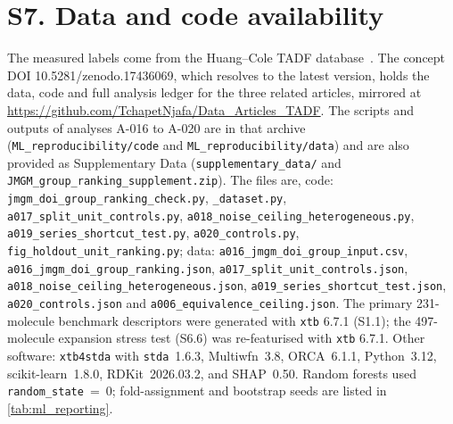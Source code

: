 \documentclass[final,3p,times,twocolumn]{elsarticle}
\begin{document}
\section*{S7. Data and code availability}
The measured labels come from the Huang--Cole TADF database~\cite{HuangCole2024}.
The concept DOI \mbox{10.5281/zenodo.17436069}, which resolves to the latest version,
holds the data, code and full analysis ledger for the three related articles, mirrored at
\url{https://github.com/TchapetNjafa/Data_Articles_TADF}.
The scripts and outputs of analyses A-016 to A-020 are in that archive
(\texttt{ML\_reproducibility/code} and \texttt{ML\_reproducibility/data}) and are also
provided as Supplementary Data (\texttt{supplementary\_data/}
and \texttt{JMGM\_group\_ranking\_supplement.zip}). The files are, code: \texttt{jmgm\_doi\_group\_ranking\_check.py}, \texttt{\_dataset.py}, \texttt{a017\_split\_unit\_controls.py}, \texttt{a018\_noise\_ceiling\_heterogeneous.py}, \texttt{a019\_series\_shortcut\_test.py}, \texttt{a020\_controls.py}, \texttt{fig\_holdout\_unit\_ranking.py}; data: \texttt{a016\_jmgm\_doi\_group\_input.csv}, \texttt{a016\_jmgm\_doi\_group\_ranking.json}, \texttt{a017\_split\_unit\_controls.json}, \texttt{a018\_noise\_ceiling\_heterogeneous.json}, \texttt{a019\_series\_shortcut\_test.json}, \texttt{a020\_controls.json} and \texttt{a006\_equivalence\_ceiling.json}.
The primary \num{231}-molecule benchmark descriptors were generated with \texttt{xtb} 6.7.1
(S1.1); the \num{497}-molecule expansion stress test (S6.6) was re-featurised with
\texttt{xtb} 6.7.1. Other software: \texttt{xtb4stda} with \texttt{stda}~1.6.3,
Multiwfn~3.8, ORCA~6.1.1, Python~3.12, scikit-learn~1.8.0, RDKit~2026.03.2, and
SHAP~0.50. Random forests used \texttt{random\_state}~=~0; fold-assignment and
bootstrap seeds are listed in \cref{tab:ml_reporting}.
\end{document}
